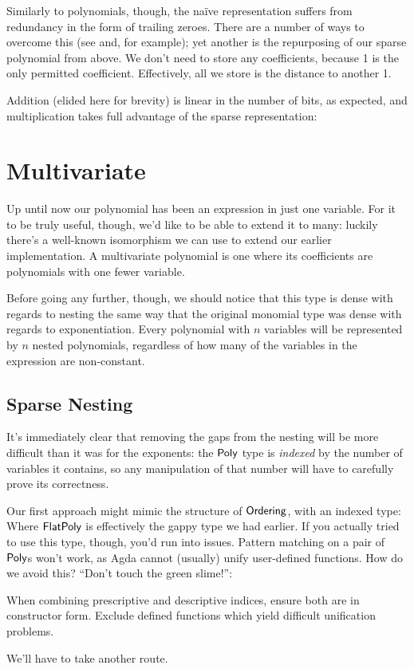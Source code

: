 \documentclass[draft, twocolumn]{article}
\begin{document}
Similarly to polynomials, though, the naïve representation suffers from
redundancy in the form of trailing zeroes. There are a number of ways to
overcome this (see\cite{meshveliani_binary-4_2018}
and\cite{escardo_libraries_2018}, for example); yet another is the repurposing
of our sparse polynomial from above.
We don't need to store any coefficients, because 1 is the only permitted
coefficient. Effectively, all we store is the distance to another 1.

Addition (elided here for brevity) is linear in the number of bits, as expected,
and multiplication takes full advantage of the sparse representation:
\section{Multivariate}
Up until now our polynomial has been an expression in just one variable. For it
to be truly useful, though, we'd like to be able to extend it to many: luckily
there's a well-known isomorphism we can use to extend our earlier
implementation. A multivariate polynomial is one where its coefficients are
polynomials with one fewer variable\cite{cheng_functional_2018}.

Before going any further, though, we should notice that this type is dense with
regards to nesting the same way that the original monomial type was dense with
regards to exponentiation. Every polynomial with \(n\) variables will be
represented by \(n\) nested polynomials, regardless of how many of the variables
in the expression are non-constant.
\subsection{Sparse Nesting}
It's immediately clear that removing the gaps from the nesting will be more
difficult than it was for the exponents: the \(\AgdaDatatype{Poly}\) type is
\emph{indexed} by the number of variables it contains, so any manipulation of
that number will have to carefully prove its correctness.

Our first approach might mimic the structure of \(\AgdaDatatype{Ordering}\),
with an indexed type:
Where \(\AgdaDatatype{FlatPoly}\) is effectively the gappy type we had earlier.
If you actually tried to use this type, though, you'd run into issues. Pattern
matching on a pair of \(\AgdaDatatype{Poly}\)s won't work, as Agda cannot
(usually) unify user-defined functions. How do we avoid this? ``Don't touch the
green slime!''\cite{mcbride_polynomial_2018}:
\begin{displayquote}
  When combining prescriptive and descriptive indices, ensure both are in
  constructor form. Exclude defined functions which yield difficult unification
  problems.
\end{displayquote}
We'll have to take another route.
\end{document}
